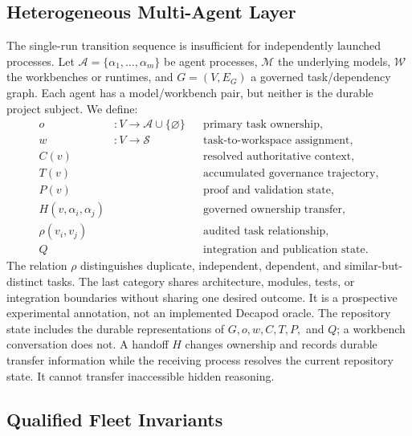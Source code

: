 \subsection{Heterogeneous Multi-Agent Layer}

The single-run transition sequence is insufficient for independently launched processes. Let $\mathcal{A}=\{\alpha_1,\ldots,\alpha_m\}$ be agent processes, $\mathcal{M}$ the underlying models, $\mathcal{W}$ the workbenches or runtimes, and $G=(V,E_G)$ a governed task/dependency graph. Each agent has a model/workbench pair, but neither is the durable project subject. We define:
\begin{align*}
o &: V \rightarrow \mathcal{A}\cup\{\varnothing\} && \text{primary task ownership},\\
w &: V \rightarrow \mathcal{S} && \text{task-to-workspace assignment},\\
C(v) &&& \text{resolved authoritative context},\\
T(v) &&& \text{accumulated governance trajectory},\\
P(v) &&& \text{proof and validation state},\\
H(v,\alpha_i,\alpha_j) &&& \text{governed ownership transfer},\\
\rho(v_i,v_j) &&& \text{audited task relationship},\\
Q &&& \text{integration and publication state}.
\end{align*}
The relation $\rho$ distinguishes duplicate, independent, dependent, and similar-but-distinct tasks. The last category shares architecture, modules, tests, or integration boundaries without sharing one desired outcome. It is a prospective experimental annotation, not an implemented Decapod oracle. The repository state includes the durable representations of $G,o,w,C,T,P,$ and $Q$; a workbench conversation does not. A handoff $H$ changes ownership and records durable transfer information while the receiving process resolves the current repository state. It cannot transfer inaccessible hidden reasoning.

\subsection{Qualified Fleet Invariants}

